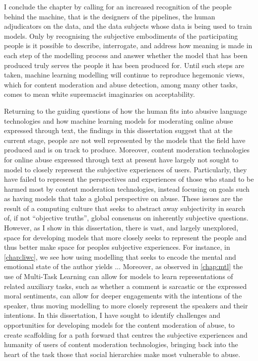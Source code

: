 I conclude the chapter by calling for an increased recognition of the people behind the machine, that is the designers of the pipelines, the human adjudicators on the data, and the data subjects whose data is being used to train models.
Only by recognising the subjective embodiments of the participating people is it possible to describe, interrogate, and address how meaning is made in each step of the modelling process and answer whether the model that has been produced truly serves the people it has been produced for.
Until such steps are taken, machine learning modelling will continue to reproduce hegemonic views, which for content moderation and abuse detection, among many other tasks, comes to mean white supremacist imaginaries on acceptability.


\vspace{5mm}
Returning to the guiding questions of how the human fits into abusive language technologies and how machine learning models for moderating online abuse expressed through text, the findings in this dissertation suggest that at the current stage, people are not well represented by the models that the field have produced and is on track to produce.
Moreover, content moderation technologies for online abuse expressed through text at present have largely not sought to model to closely represent the subjective experiences of users.
Particularly, they have failed to represent the perspectives and experiences of those who stand to be harmed most by content moderation technologies, instead focusing on goals such as having models that take a global perspective on abuse.
These issues are the result of a computing culture that seeks to abstract away subjectivity in search of, if not ``objective truths'', global consensus on inherently subjective questions.
However, as I show in this dissertation, there is vast, and largely unexplored, space for developing models that more closely seeks to represent the people and thus better make space for peoples subjective experiences.
For instance, in \cref{chap:liwc}, we see how using modelling that seeks to encode the mental and emotional state of the author yields ... %
Moreover, as observed in \cref{chap:mtl} the use of Multi-Task Learning can allow for models to learn representations of related auxiliary tasks, such as whether a comment is sarcastic or the expressed moral sentiments, can allow for deeper engagements with the intentions of the speaker, thus moving modelling to more closely represent the speakers and their intentions.
In this dissertation, I have sought to identify challenges and opportunities for developing models for the content moderation of abuse, to create scaffolding for a path forward that centres the subjective experiences and humanity of users of content moderation technologies, bringing back into the heart of the task those that social hierarchies make most vulnerable to abuse.
